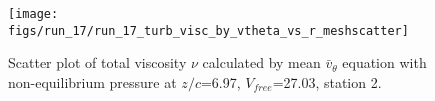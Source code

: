 \begin{figure}[H]
\centering
\texttt{[image: figs/run\_17/run\_17\_turb\_visc\_by\_vtheta\_vs\_r\_meshscatter]}
\caption{Scatter plot of total viscosity $\nu$ calculated by mean $\bar{v}_{\theta}$ equation with non-equilibrium pressure at $z/c$=6.97, $V_{free}$=27.03, station 2.}
\label{fig:run_17_turb_visc_by_vtheta_vs_r_meshscatter}
\end{figure}


